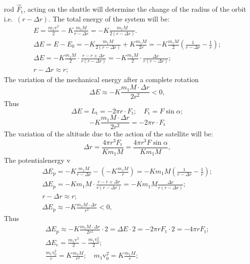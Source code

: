 \begin{description}
  rod $\vec F_{\mathrm{t}}$, acting on the shuttle will determine the change
  of the radius of the orbit i.e.\ $(r - \Delta r)$. The total energy of the
  system will be:
  \begin{gather*}
    E = \frac{m_1\mathrm{v}^2}{2} - K\frac{m_1M}{r - \Delta r}
      = -K\frac{m_1M}{2(r - \Delta r)}. \\
    \Delta E = E - E_0
      = -K\frac{m_1M}{2(r - \Delta r)} + K\frac{m_1M}{2r}
      = -K\frac{m_1M}{2}
        \left(\frac{1}{r - \Delta r} - \frac{1}{r}\right); \\
    \Delta E = -K\frac{m_1M}{2}\cdot\frac{r - r + \Delta r}{r(r - \Delta r)}
      = -K\frac{m_1M}{2}\cdot\frac{\Delta r}{r(r - \Delta r)}; \\
    r - \Delta r \approx r;
  \end{gather*}
  The variation of the mechanical energy after a complete rotation
  \[
    \Delta E \approx -K\frac{m_1M\cdot\Delta r}{2r^2} < 0,
  \]
  Thus
  \[
    \Delta E = L_{\mathrm{t}} = -2\pi r\cdot F_{\mathrm{t}};\quad
    F_{\mathrm{t}} = F\sin\alpha;
  \]
  \[
    -K\frac{m_1M\cdot\Delta r}{2r^2} = -2\pi r\cdot F_{\mathrm{t}}
  \]
  The variation of the altitude due to the action of the satellite will be:
  \[
    \Delta r = \frac{4\pi r^3F_{\mathrm{t}}}{Km_1M}
      = \frac{4\pi r^3F\sin\alpha}{Km_1M},
  \]
  The potentialenergy v %
  \begin{gather*}
    \Delta E_{\mathrm{p}} = -K\frac{m_1M}{r - \Delta r}
      - \left(-K\frac{m_1M}{r}\right)
      = -Km_1M\left(\frac{1}{r - \Delta r} - \frac{1}{r}\right); \\
    \Delta E_{\mathrm{p}} = -Km_1M\cdot\frac{r - r + \Delta r}{r(r - \Delta r)}
      = -Km_1M\frac{\Delta r}{r(r - \Delta r)}; \\
    r - \Delta r \approx r; \\
    \Delta E_{\mathrm{p}} \approx -K\frac{m_1M\cdot\Delta r}{r^2} < 0,
  \end{gather*}
  Thus
  \begin{gather*}
    \Delta E_{\mathrm{p}} \approx -K\frac{m_1M\cdot\Delta r}{2r^2}\cdot2
      = \Delta E\cdot2 = -2\pi rF_{\mathrm{t}}\cdot2
      = -4\pi rF_{\mathrm{t}}; \\
    \Delta E_{\mathrm{c}} = \frac{m_1\mathrm{v}^2}{2}
      - \frac{m_1\mathrm{v}_0^2}{2}; \\
    \frac{m_1\mathrm{v}_0^2}{r} = K\frac{m_1M}{r^2};\quad
      m_1\mathrm{v}_0^2 = K\frac{m_1M}{r}; \\

\end{gather*}
\end{description}
